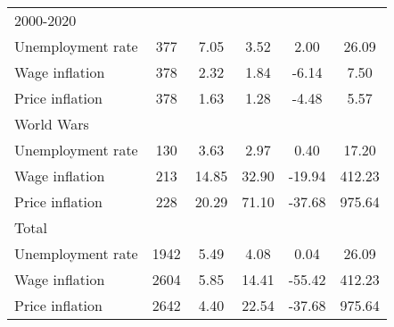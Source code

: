 \begin{table}[htbp]
\begin{tabular}{l*{1}{ccccc}}
\hline
2000-2020           &            &            &            &            &            \\
Unemployment rate   &         377&        7.05&        3.52&        2.00&       26.09\\
Wage inflation      &         378&        2.32&        1.84&       -6.14&        7.50\\
Price inflation     &         378&        1.63&        1.28&       -4.48&        5.57\\
\hline
World Wars          &            &            &            &            &            \\
Unemployment rate   &         130&        3.63&        2.97&        0.40&       17.20\\
Wage inflation      &         213&       14.85&       32.90&      -19.94&      412.23\\
Price inflation     &         228&       20.29&       71.10&      -37.68&      975.64\\
\hline
Total               &            &            &            &            &            \\
Unemployment rate   &        1942&        5.49&        4.08&        0.04&       26.09\\
Wage inflation      &        2604&        5.85&       14.41&      -55.42&      412.23\\
Price inflation     &        2642&        4.40&       22.54&      -37.68&      975.64\\
\hline\hline
\end{tabular}
\end{table}
